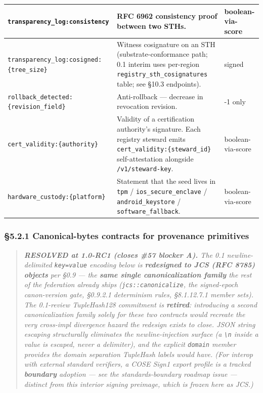 \documentclass[11pt]{article}
\begin{document}
{\begin{longtable}{|p{5.33cm}|p{5.33cm}|p{5.33cm}|}
\texttt{transparency\_log:consistency} & RFC 6962 consistency proof between two STHs. & boolean-via-score \\ \hline
\texttt{transparency\_log:cosigned:\{tree\_size\}} & Witness cosignature on an STH (substrate-conformance path; 0.1 interim uses per-region \texttt{registry\_sth\_cosignatures} table; see §10.3 endpoints). & signed \\ \hline
\texttt{rollback\_detected:\{revision\_field\}} & Anti-rollback — decrease in revocation revision. & -1 only \\ \hline
\texttt{cert\_validity:\{authority\}} & Validity of a certification authority's signature. Each registry steward emits \texttt{cert\_validity:\{steward\_id\}} self-attestation alongside \texttt{/v1/steward-key}. & boolean-via-score \\ \hline
\texttt{hardware\_custody:\{platform\}} & Statement that the seed lives in \texttt{tpm} / \texttt{ios\_secure\_enclave} / \texttt{android\_keystore} / \texttt{software\_fallback}. & boolean-via-score \\ \hline
\end{longtable}}


\subsubsection*{§5.2.1 Canonical-bytes contracts for provenance primitives}


\begin{quote}\itshape \textbf{RESOLVED at 1.0-RC1 (closes \#57 blocker A).} The 0.1 newline-delimited \texttt{key=value} encoding below is \textbf{redesigned to JCS (RFC 8785) objects} per §0.9 — the \textbf{same single canonicalization family} the rest of the federation already ships (\texttt{jcs::canonicalize}, the signed-epoch canon-version gate, §0.9.2.1 determinism rules, §8.1.12.7.1 member sets). The 0.1-review TupleHash128 commitment is \textbf{retired}: introducing a second canonicalization family solely for these two contracts would recreate the very cross-impl divergence hazard the redesign exists to close. JSON string escaping structurally eliminates the newline-injection surface (a \texttt{\textbackslash{}n} inside a value is escaped, never a delimiter), and the explicit \texttt{domain} member provides the domain separation TupleHash labels would have. \textit{(For interop with external standard verifiers, a COSE Sign1 export profile is a tracked \textbf{boundary} adoption — see the standards-boundary roadmap issue — distinct from this interior signing preimage, which is frozen here as JCS.)}\end{quote}
\end{document}
